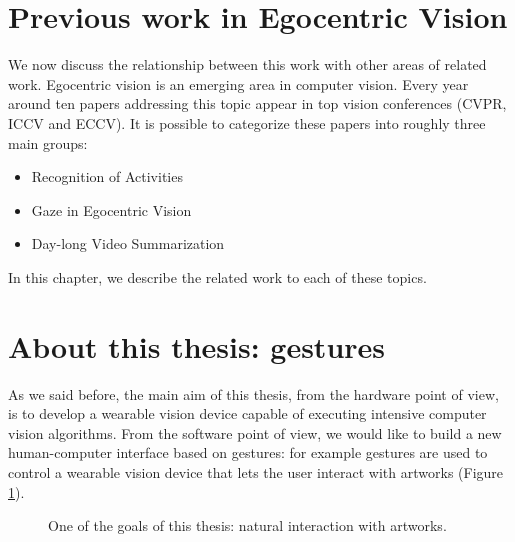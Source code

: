 \section{Previous work in Egocentric Vision}
We now discuss the relationship between this work with other areas of related work. Egocentric vision is an emerging area in computer vision. Every year around ten papers addressing this topic appear in top vision conferences (CVPR, ICCV and ECCV). It is possible to categorize these papers into roughly three main groups:
\begin{itemize}
\item Recognition of Activities
\item Gaze in Egocentric Vision
\item Day-long Video Summarization
\end{itemize}

In this chapter, we describe the related work to each of these topics.



\section{About this thesis: gestures}
As we said before, the main aim of this thesis, from the hardware point of view, is to develop a wearable vision device capable of executing intensive computer vision algorithms. From the software point of view, we would like to build a new human-computer interface based on gestures: for example gestures are used to control a wearable vision device that lets the user interact with artworks (Figure \ref{fig:interaction}).

\begin{figure}[tb]
\centering
{}
\caption{One of the goals of this thesis: natural interaction with artworks.}
\label{fig:interaction}
\end{figure}

